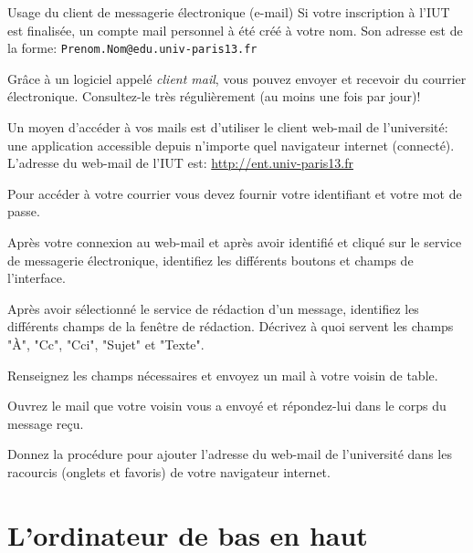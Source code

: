 \begin{exercice}
  \begin{exercicelet}{Usage du client de messagerie électronique
      (e-mail)}
    Si votre inscription à l'IUT est finalisée, un compte mail personnel
    à été créé à votre nom. Son adresse est de la forme:
    \texttt{Prenom.Nom@edu.univ-paris13.fr}

    Grâce à un logiciel appelé \emph{client mail}, vous pouvez envoyer
    et recevoir du courrier électronique. Consultez-le très
    régulièrement (au moins une fois par jour)!

    Un moyen d'accéder à vos mails est d'utiliser le client web-mail de
    l'université: une application accessible depuis n'importe quel
    navigateur internet (connecté).  L'adresse du web-mail de l'IUT est:
    \url{http://ent.univ-paris13.fr}

    Pour accéder à votre courrier vous devez fournir votre identifiant
    et votre mot de passe.

    \begin{questions}
    \item Après votre connexion au web-mail et après avoir identifié et
      cliqué sur le service de messagerie électronique, identifiez les
      différents boutons et champs de l'interface.
    \item Après avoir sélectionné le service de rédaction d'un message,
      identifiez les différents champs de la fenêtre de
      rédaction. Décrivez à quoi servent les champs "À", "Cc", "Cci",
      "Sujet" et "Texte".
    \item Renseignez les champs nécessaires et envoyez un mail à votre
      voisin de table.
    \item Ouvrez le mail que votre voisin vous a envoyé et répondez-lui
      dans le corps du message reçu.
    \item Donnez la procédure pour ajouter l'adresse du web-mail de
      l'université dans les racourcis (onglets et favoris) de votre
      navigateur internet.
    \end{questions}
  \end{exercicelet}
\end{exercice}

\section{L'ordinateur de bas en haut}
